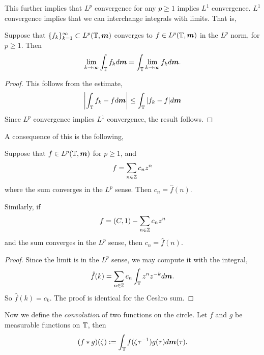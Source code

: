 \documentclass{owmaths}
\begin{document}
This further implies that $L^p$ convergence
for any $p \geq 1$ implies $L^1$ convergence. $L^1$ convergence
implies that we can interchange integrals with limits. That is,
\begin{proposition}
    Suppose that $\{f_k\}_{k=1}^\infty \subset L^p(\mathbb{T},\boldsymbol{m})$
    converges to $f \in L^p(\mathbb{T},\boldsymbol{m})$ in the $L^p$ norm, for $p \geq 1$.
    Then 
    \begin{equation*}
        \lim_{k\rightarrow\infty} \int_{\mathbb{T}} f_k d\boldsymbol{m} = \int_{\mathbb{T}} \lim_{k\rightarrow\infty} f_kd\boldsymbol{m}.
    \end{equation*}
\end{proposition}
\begin{proof}
    This follows from the estimate,
    \begin{equation*}
        \left| \int_{\mathbb{T}} f_k-fd\boldsymbol{m}\right| \leq \int_{\mathbb{T}} |f_k-f|d\boldsymbol{m} 
    \end{equation*}
    Since $L^p$ convergence implies $L^1$ convergence, the result follows.
\end{proof}

A consequence of this is the following,
\begin{lemma}
    Suppose that $f \in L^p(\mathbb{T},\boldsymbol{m})$ for $p \geq 1$, and
    \begin{equation*}
        f = \sum_{n\in \mathbb{Z}} c_n z^n
    \end{equation*}
    where the sum converges in the $L^p$ sense. Then $c_n = \hat{f}(n)$. 
    
    Similarly, if
    \begin{equation*}
        f = (C,1)-\sum_{n \in \mathbb{Z}} c_n z^n
    \end{equation*}
    and the sum converges in the $L^p$ sense, then $c_n = \hat{f}(n)$.
\end{lemma}     
\begin{proof}
    Since the limit is in the $L^p$ sense, we may compute it with the integral,
    \begin{equation*}
        \hat{f}(k) = \sum_{n \in \mathbb{Z}} c_n \int_{\mathbb{T}} z^n z^{-k}d\boldsymbol{m}.
    \end{equation*}
    So $\hat{f}(k) = c_k$. The proof is identical for the Ces\`aro sum.
\end{proof}


Now we define the \emph{convolution} of two functions on the circle. Let $f$
and $g$ be measurable functions on $\mathbb{T}$, then
\begin{equation*}
    (f*g)(\zeta) := \int_{\mathbb{T}} f(\zeta \tau^{-1}) g(\tau)d\boldsymbol{m}(\tau).
\end{equation*}
\end{document}
